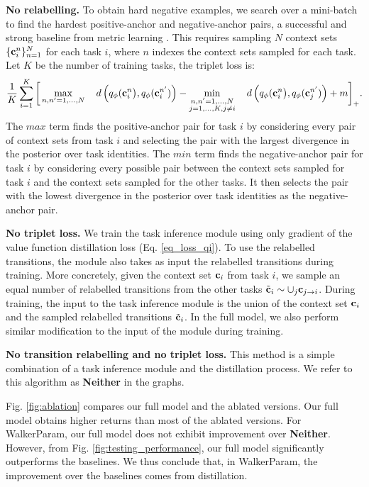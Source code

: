 \textbf{No relabelling.} To obtain  hard negative examples, we search over a mini-batch to find the hardest positive-anchor and negative-anchor pairs, a successful and strong baseline from metric learning \cite{hermans2017defense}. This requires sampling $N$ context sets $\{{\bf c}^n_i\}_{n=1}^N$ for each task $i$, where $n$ indexes the context sets sampled for each task.
Let $K$ be the number of training tasks, the triplet loss is:
\begin{equation}\label{eq_reform_triplet}
    \frac{1}{K} \sum_{i=1 }^{K} \bigg[\max_{n,n'=1,\ldots, N} \quad d \left(q_{\phi}({\bf c}^n_{i}\big), q_{\phi} ({\bf c}^{n'}_{i}) \right)
    -  \min_{\substack{n,n'=1,\ldots, N \\ j=1,\ldots,K, j \neq i}} \quad d \left(q_{\phi}({\bf c}^n_{i}\big), q_{\phi} ({\bf c}^{n'}_{j}) \right) + m\bigg]_{+}.
\end{equation}
The $max$ term
finds the positive-anchor pair
for task $i$
by considering every pair of context sets from task $i$ and selecting the pair with the largest divergence in the posterior over task identities. The $min$ term
finds the negative-anchor pair
for task $i$
by considering every possible pair between the context sets sampled for task $i$ and the context sets sampled for the other tasks. It then selects the pair with the lowest divergence in the posterior over task identities
as the negative-anchor pair.

\textbf{No triplet loss.} We train the task inference module using only gradient of the value function distillation loss (Eq. \ref{eq_loss_qi}).
To use the relabelled transitions, the module also takes as input the relabelled transitions during training.
More concretely, given the context set ${\bf c}_i$ from task $i$, we sample an equal number of relabelled transitions from the other tasks $\tilde{{\bf c}}_i \sim \cup_j {{\bf c}_{j \rightarrow{i} } }$. During training, the input to the task inference module is the union of the context set ${\bf c}_i$ and the sampled relabelled transitions $\tilde{{\bf c}}_i$. In the full model, we also perform similar modification to the input of the module during training.

\textbf{No transition relabelling and no triplet loss.} This method is a simple combination of a task inference module and the distillation process. We refer to this algorithm as \textbf{Neither} in the graphs.

Fig. \ref{fig:ablation} compares our full model and the ablated versions. Our full model obtains higher returns than most of the ablated versions. For WalkerParam, our full model does not exhibit improvement over  \textbf{Neither}. However, from Fig. \ref{fig:testing_performance}, our full model significantly outperforms the baselines. We thus conclude that, in WalkerParam, the improvement over the baselines comes from distillation.

